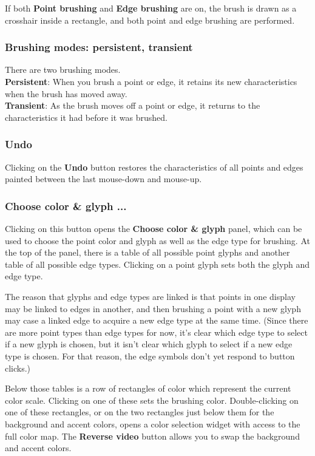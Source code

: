 \documentclass[11pt]{article}
\begin{document}
If both {\bf Point brushing} and {\bf Edge brushing} are on, the
brush is drawn as a crosshair inside a rectangle, and both point and
edge brushing are performed.

\subsubsection{Brushing modes:  persistent, transient}
%
There are two brushing modes.
\medskip
\noindent
\\{\bf Persistent}:  When you brush a point or edge, it retains its new
  characteristics when the brush has moved away.
\\{\bf Transient}:  As the brush moves off a point or edge, it returns
  to the characteristics it had before it was brushed.

\subsubsection{Undo}
%
Clicking on the {\bf Undo} button restores the characteristics
of all points and edges painted between the last mouse-down and
mouse-up.

\subsubsection{Choose color \& glyph ...}

Clicking on this button opens the {\bf Choose color \& glyph} panel,
which can be used to choose the point color and glyph as well as the
edge type for brushing.  At the top of the panel, there is a table of
all possible point glyphs and another table of all possible edge types.
Clicking on a point glyph sets both the glyph and edge type.

The reason that glyphs and edge types are linked is that points in one
display may be linked to edges in another, and then brushing a point
with a new glyph may case a linked edge to acquire a new edge type at
the same time.  (Since there are more point types than edge types for
now, it's clear which edge type to select if a new glyph is chosen,
but it isn't clear which glyph to select if a new edge type is chosen.
For that reason, the edge symbols don't yet respond to button clicks.)

Below those tables is a row of rectangles of color which represent the
current color scale.  Clicking on one of these sets the brushing color.
Double-clicking on one of these rectangles, or on the two rectangles
just below them for the background and accent colors, opens a color
selection widget with access to the full color map.  The {\bf Reverse
video} button allows you to swap the background and accent colors.
\end{document}
